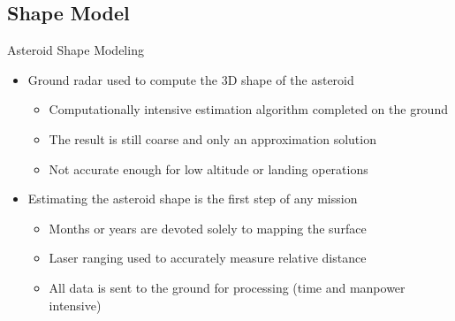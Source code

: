 \documentclass[11pt,professionalfonts,aspectratio=169]{beamer}
\begin{document}
\subsection[Shape Model]{Shape Model}
\begin{frame}{Asteroid Shape Modeling}
    \begin{itemize}
        \item<1-> Ground radar used to compute the 3D shape of the asteroid
        \begin{itemize}
            \item Computationally intensive estimation algorithm completed on the ground 
            \item The result is still coarse and only an approximation solution
            \item Not accurate enough for low altitude or landing operations
        \end{itemize}
    \item<2-> Estimating the asteroid shape is the first step of any mission
    \begin{itemize}
        \item Months or years are devoted solely to mapping the surface
        \item Laser ranging used to accurately measure relative distance 
        \item All data is sent to the ground for processing (time and manpower intensive)
    \end{itemize}
    \end{itemize}
    
\end{frame}
\end{document}
